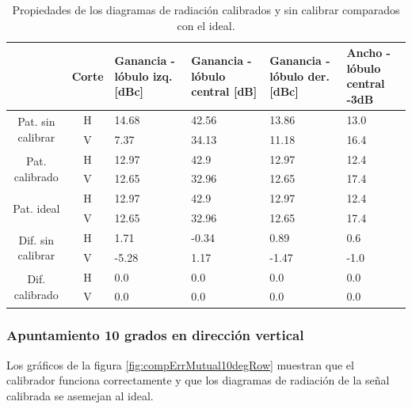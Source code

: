 \begin{table}[H]
  \footnotesize
  \centering
  \begin{tabular}{|c|c|p{2cm}|p{2.5cm}|p{2.5cm}|p{2.5cm}|}
    \cline{2-6}
    \multicolumn{1}{c|}{} & Corte & Ganancia - lóbulo izq. [dBc] & Ganancia - lóbulo central [dB] &
    Ganancia - lóbulo der. [dBc] & Ancho - lóbulo central -3dB \tabularnewline\hline
    \multirow{2}{2cm}{Pat. sin calibrar} & H & 14.68 & 42.56 & 13.86 & 13.0 \tabularnewline\cline{2-6}
     & V & 7.37 & 34.13 & 11.18 & 16.4 \tabularnewline\hline
    \multirow{2}{2cm}{Pat. calibrado} & H & 12.97 & 42.9 & 12.97 & 12.4 \tabularnewline\cline{2-6}
     & V & 12.65 & 32.96 & 12.65 & 17.4 \tabularnewline\hline
    \multirow{2}{2cm}{Pat. ideal} & H & 12.97 & 42.9 & 12.97 & 12.4 \tabularnewline\cline{2-6}
     & V & 12.65 & 32.96 & 12.65 & 17.4 \tabularnewline\hline
    \multirow{2}{2cm}{Dif. sin calibrar} & H & 1.71 & -0.34 & 0.89 & 0.6\tabularnewline\cline{2-6}
     & V & -5.28 & 1.17 & -1.47 & -1.0 \tabularnewline\hline
    \multirow{2}{2cm}{Dif. calibrado} & H & 0.0 & 0.0 & 0.0 & 0.0 \tabularnewline\cline{2-6}
     & V & 0.0 & 0.0 & 0.0 & 0.0 \tabularnewline\hline
  \end{tabular}
  \caption{Propiedades de los diagramas de radiación calibrados y sin calibrar comparados con el ideal.}
  \label{tab:compErrMutual10degCol}
\end{table}


\subsubsection{Apuntamiento 10 grados en dirección vertical}

Los gráficos de la figura \ref{fig:compErrMutual10degRow} muestran que el calibrador funciona correctamente y que los diagramas de 
radiación de la señal calibrada se asemejan al ideal. 

